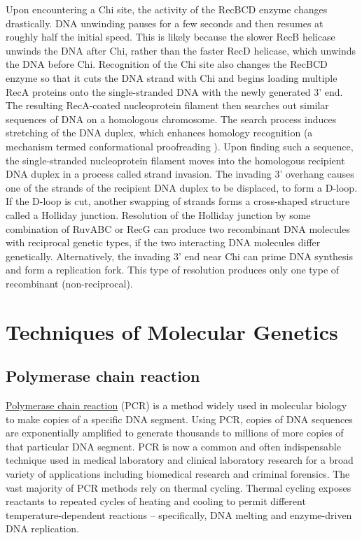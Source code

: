 Upon encountering a Chi site, the activity of the RecBCD enzyme changes drastically. DNA unwinding pauses for a few seconds and then resumes at roughly half the initial speed. This is likely because the slower RecB helicase unwinds the DNA after Chi, rather than the faster RecD helicase, which unwinds the DNA before Chi. Recognition of the Chi site also changes the RecBCD enzyme so that it cuts the DNA strand with Chi and begins loading multiple RecA proteins onto the single-stranded DNA with the newly generated 3' end. The resulting RecA-coated nucleoprotein filament then searches out similar sequences of DNA on a homologous chromosome. The search process induces stretching of the DNA duplex, which enhances homology recognition (a mechanism termed conformational proofreading ). Upon finding such a sequence, the single-stranded nucleoprotein filament moves into the homologous recipient DNA duplex in a process called strand invasion. The invading 3' overhang causes one of the strands of the recipient DNA duplex to be displaced, to form a D-loop. If the D-loop is cut, another swapping of strands forms a cross-shaped structure called a Holliday junction. Resolution of the Holliday junction by some combination of RuvABC or RecG can produce two recombinant DNA molecules with reciprocal genetic types, if the two interacting DNA molecules differ genetically. Alternatively, the invading 3' end near Chi can prime DNA synthesis and form a replication fork. This type of resolution produces only one type of recombinant (non-reciprocal).

\hypertarget{techniques-of-molecular-genetics}{%
\chapter{Techniques of Molecular Genetics}\label{techniques-of-molecular-genetics}}

\hypertarget{polymerase-chain-reaction}{%
\section{Polymerase chain reaction}\label{polymerase-chain-reaction}}

\href{https://en.wikipedia.org/wiki/Polymerase_chain_reaction}{Polymerase chain reaction} (PCR) is a method widely used in molecular biology to make copies of a specific DNA segment. Using PCR, copies of DNA sequences are exponentially amplified to generate thousands to millions of more copies of that particular DNA segment. PCR is now a common and often indispensable technique used in medical laboratory and clinical laboratory research for a broad variety of applications including biomedical research and criminal forensics. The vast majority of PCR methods rely on thermal cycling. Thermal cycling exposes reactants to repeated cycles of heating and cooling to permit different temperature-dependent reactions -- specifically, DNA melting and enzyme-driven DNA replication.

